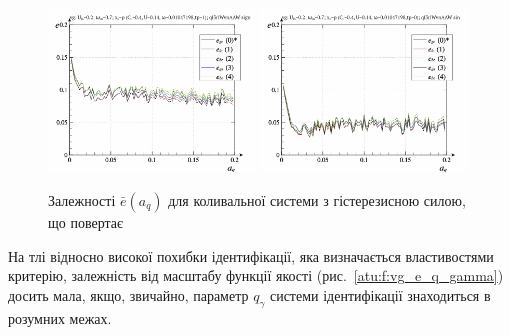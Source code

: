 \begin{figure}[ht!]
\begin{center}
  \includegraphics[width=0.49\textwidth]{p/cha/vg/vg_id-p_a_q_sign.png}
  \hfill
  \includegraphics[width=0.49\textwidth]{p/cha/vg/vg_id-p_a_q_sin.png}
\end{center}
\caption{Залежності $\bar{e}(a_q) $ для коливальної системи з гістерезисною силою, що повертає}
\label{atu:f:vg_e_a_q}
\end{figure}

На тлі відносно високої похибки ідентифікації, яка визначається
властивостями критерію, залежність від масштабу функції якості
(рис.~\ref{atu:f:vg_e_q_gamma}) досить мала, якщо, звичайно, параметр
$ q_\gamma $ системи ідентифікації знаходиться в розумних межах.

